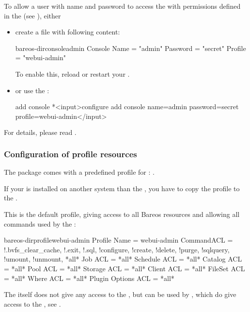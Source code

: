 To allow a user with name  and password  to access the \bareosDir
with permissions defined in the  (see ),
either
\begin{itemize}
\item create a file  with following content:
\begin{bareosConfigResource}{bareos-dir}{console}{admin}
Console {
  Name = "admin"
  Password = "secret"
  Profile = "webui-admin"
}
\end{bareosConfigResource}

To enable this, reload or restart your \bareosDir.
\item or use the :
\begin{bconsole}{add console}
*<input>configure add console name=admin password=secret profile=webui-admin</input>
\end{bconsole}
\end{itemize}


For details, please read .



\subsubsection{Configuration of profile resources}
    \label{sec:webui-profile}

The package  comes with a predefined profile for \bareosWebui: .

If your \bareosWebui is installed on another system than the \bareosDir, you have to copy the profile to the \bareosDir.

This is the default profile, giving access to all Bareos resources and allowing all commands used by the \bareosWebui:

\begin{bareosConfigResource}{bareos-dir}{profile}{webui-admin}
Profile {
  Name = webui-admin
  CommandACL = !.bvfs_clear_cache, !.exit, !.sql, !configure, !create, !delete, !purge, !sqlquery, !umount, !unmount, *all*
  Job ACL = *all*
  Schedule ACL = *all*
  Catalog ACL = *all*
  Pool ACL = *all*
  Storage ACL = *all*
  Client ACL = *all*
  FileSet ACL = *all*
  Where ACL = *all*
  Plugin Options ACL = *all*
}
\end{bareosConfigResource}

The  itself does not give any access to the \bareosDir,
but can be used by , which do give access to the \bareosDir, see .

